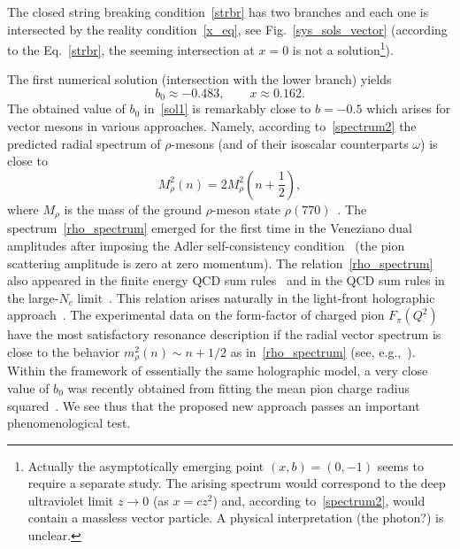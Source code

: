 \documentclass[a4paper,11pt]{article}
\newcommand{\lb}[0]{\left(}
\newcommand{\rb}[0]{\right)}
\begin{document}
The closed string breaking condition~\eqref{strbr} has two branches and each one is intersected by the reality condition~\eqref{x_eq}, see Fig.~\ref{sys_sols_vector}
(according to the Eq.~\eqref{strbr}, the seeming intersection at $x=0$ is not a solution\footnote{Actually the asymptotically emerging point $(x,b)=(0,-1)$
seems to require a separate study. The arising spectrum would correspond to the deep ultraviolet limit $z\rightarrow0$ (as $x=cz^2$) and, according to~\eqref{spectrum2},
would contain a massless vector particle. A physical interpretation (the photon?) is unclear.}).

The first numerical solution (intersection with the lower branch) yields
\begin{equation}
\label{sol1}
  b_0\approx-0.483,\qquad
  x\approx0.162.
\end{equation}
The obtained value of $b_0$ in~\eqref{sol1} is remarkably close to \(b=-0.5\) which arises
for vector mesons in various approaches. Namely, according to~\eqref{spectrum2}
the predicted radial spectrum of \(\rho\)-mesons (and of their isoscalar counterparts $\omega$)
is close to
\begin{equation}
\label{rho_spectrum}
  M_\rho^2(n)=2M_\rho^2\lb n+\frac{1}{2}\rb,
\end{equation}
where \(M_\rho\) is the mass of the ground \(\rho\)-meson state $\rho(770)$~\cite{pdg}.
The spectrum~\eqref{rho_spectrum} emerged for the first time in the Veneziano dual amplitudes
after imposing the Adler self-consistency condition~\cite{Ademollo:1969nx,Collins:1971ff,Collins:1977jy}
(the pion scattering amplitude is zero at zero momentum).
The relation~\eqref{rho_spectrum} also appeared
in the finite energy QCD sum rules~\cite{Krasnikov:1981vw} and in the QCD sum rules
in the large-$N_c$ limit~\cite{Afonin:2003gp,Afonin:2004yb,Afonin:2006da}.
This relation arises naturally in the light-front holographic approach~\cite{br3}.
The experimental data on the form-factor of charged pion $F_\pi(Q^2)$
have the most satisfactory resonance description if the radial vector spectrum is close to the behavior
$m_\rho^2(n)\sim n+1/2$ as in~\eqref{rho_spectrum} (see, e.g.,~\cite{Afonin:2021cwo,br3}).
Within the framework
of essentially the same holographic model, a very close value of $b_0$ was recently obtained from
fitting the mean pion charge radius squared~\cite{Afonin:2021cwo}. We see thus that the proposed new
approach passes an important phenomenological test.
\end{document}

